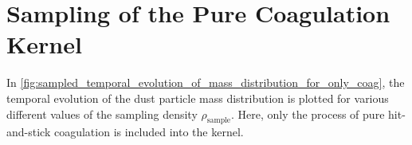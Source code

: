 







    \cleardoublepage\section{Sampling of the Pure Coagulation Kernel}

        In \cref{fig:sampled_temporal_evolution_of_mass_distribution_for_only_coag}, the 
        temporal evolution of the dust particle mass distribution is plotted for 
        various different values of the sampling density $\rho_\text{sample}$. Here, 
        only the process of pure hit-and-stick coagulation is included into the kernel. \\


